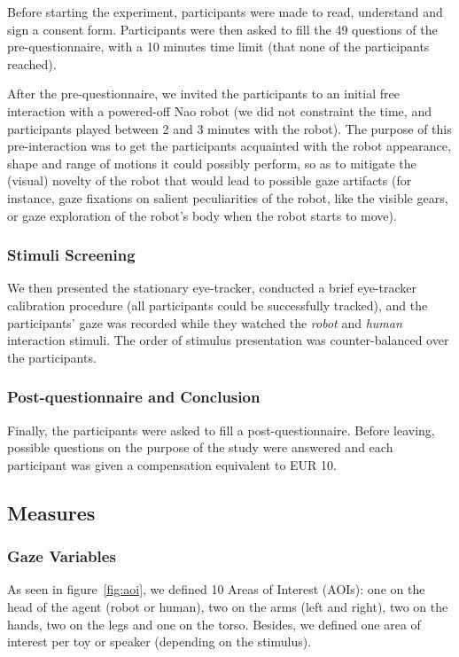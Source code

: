 \documentclass[lettersize, noapacite, twoside, HRI]{apa_HRI}
\begin{document}
Before starting the experiment, participants were made to read, understand and sign a
consent form. Participants were then asked to fill the 49 questions of
the pre-questionnaire, with a 10 minutes time limit (that none of the participants
reached).

After the pre-questionnaire, we invited the participants to an initial
free interaction with a powered-off Nao robot (we did not constraint
the time, and participants played between 2 and 3 minutes with the robot).
The purpose of this pre-interaction was to get the participants acquainted with the
robot appearance, shape and range of motions it could possibly perform, so as to
mitigate the (visual) novelty of the robot that would lead to possible
gaze artifacts (for instance, gaze fixations on salient peculiarities of the
robot, like the visible gears, or gaze exploration of the robot's body when the robot
starts to move).

\subsubsection{Stimuli Screening}

We then presented the stationary eye-tracker, conducted a brief eye-tracker
calibration procedure (all participants could be successfully tracked), and the
participants' gaze was recorded while they watched the \emph{robot} and
\emph{human} interaction stimuli. The order of stimulus presentation
was counter-balanced over the participants.

\subsubsection{Post-questionnaire and Conclusion}

Finally, the participants were asked to fill a post-questionnaire.
Before leaving, possible questions on the purpose of the study were
answered and each participant was given a compensation equivalent to EUR 10.

\subsection{Measures}

\subsubsection{Gaze Variables}

As seen in figure~\ref{fig:aoi}, we defined 10 Areas of Interest (AOIs): one on
the head of the agent (robot or human), two on the arms (left and right), two on
the hands, two on the legs and one on the torso. Besides, we defined one area of
interest per toy or speaker (depending on the stimulus).
\end{document}
